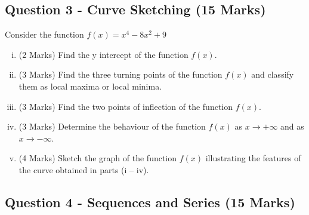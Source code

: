 ﻿ \documentclass[a4paper,12pt]{article}
\begin{document}
\bigskip
\subsection*{Question 3 - Curve Sketching (15 Marks)}
Consider the function $f(x) = x^4 -  8x^2 + 9$

\begin{enumerate}[(i)]
	\item (2 Marks) Find the y intercept of the function $f(x)$.
	\item (3 Marks) Find the three turning points of the function $f(x)$ and classify them as local
	maxima or local minima.
	\item (3 Marks)  Find the two points of inflection of the function $f(x)$.
	
	\item (3 Marks)  Determine the behaviour of the function $f(x)$ as $x \rightarrow + \infty$ and as $x \rightarrow - \infty $.
	\item (4 Marks) Sketch the graph of the function $f(x)$ illustrating the features of the curve obtained
	in parts (i – iv). 
\end{enumerate}



\subsection*{Question 4 - Sequences and Series (15 Marks)}

\end{document}
